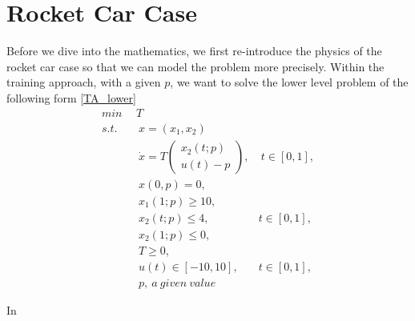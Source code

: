\chapter{Rocket Car Case}
Before we dive into the mathematics, we first re-introduce the physics of the rocket car case so that we can model the problem more precisely. Within the training approach, with a given $p$, we want to solve the lower level problem of the following form \ref{TA_lower}
\begin{subequations}
	\begin{align}
    	\underset{}{min} \   & \  T \\ 
		s.t.  & \ \ x = (x_1, x_2)   \label{ta_rc_x} \\ 
		& \ \  \dot{x} = T  \begin{pmatrix}  x_2(t;p) \\ u(t)-p   \end{pmatrix}, & \ t \in [0,1],  \label{ta_rc_partial} \\
		& \ \ x(0,p) = 0, \label{ta_rc_t0}\\
		& \ \ x_1(1;p) \geq 10, \label{ta_rc_x1_t1} \\
		& \ \ x_2(t;p) \leq 4, & t \in [0,1], \label{ta_rc_x2_tc} \\
		& \ \ x_2(1;p) \leq 0, \label{ta_rc_x2_t1}  \\
		& \ \ T \geq 0, \\
		& \ \ u(t) \in [-10, 10], & t \in [0,1], \\
		& \ \ p, \   a \ given \ value
	\end{align}
	\label{TA_lower}
\end{subequations}

In 

 
